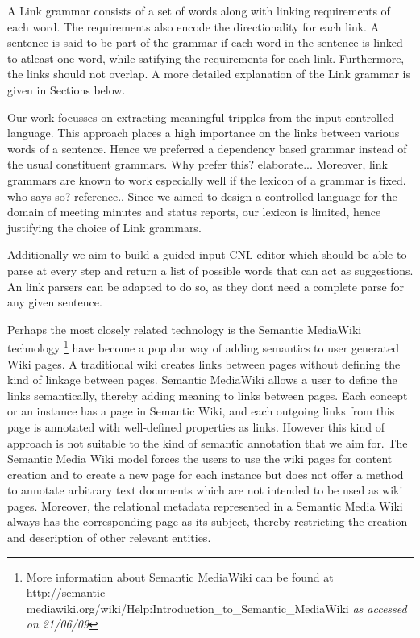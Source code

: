 A Link grammar consists of a set of words along with linking requirements of each word. The requirements also encode the directionality for each link. A sentence is said to be part of the grammar if each word in the sentence is linked to atleast one word, while satifying the requirements for each link. Furthermore, the links should not overlap. A more detailed explanation of the Link grammar is given in Sections below.

Our work focusses on extracting meaningful tripples from the input controlled language. This approach places a high importance on the links between various words of a sentence. Hence we preferred a dependency based grammar instead of the usual constituent grammars. 
Why prefer this? elaborate...
Moreover, link grammars are known to work especially well if the lexicon of a grammar is fixed.
who says so? reference..
 Since we aimed to design a controlled language for the domain of meeting minutes and status reports, our lexicon is limited, hence justifying the choice of Link grammars.
 
 Additionally we aim to build a guided input CNL editor which should be able to parse at every step and return a list of possible words that can act as suggestions. An link parsers can be adapted to do so, as they dont need a complete parse for any given sentence. 
 
 




 
Perhaps the most closely related technology is the Semantic MediaWiki technology \footnote{More information about Semantic MediaWiki can be found 
at http://semantic-mediawiki.org/wiki/Help:Introduction\_to\_Semantic\_MediaWiki \emph{as accessed on 21/06/09}} have become a popular way of adding semantics to user generated Wiki pages.
 A  traditional wiki creates links between pages without defining the kind of linkage between pages. Semantic MediaWiki allows a user to define the links semantically, thereby adding meaning to links between pages. 
Each concept or an instance has a page in Semantic Wiki, and each outgoing links from this page is annotated with well-defined properties as links. However this kind of approach is not suitable to the kind of 
semantic annotation that we aim for. The Semantic Media Wiki model forces the users to use the wiki pages for content creation and to create a new page for each instance but does not offer a method to annotate arbitrary 
text documents which are not intended to be used as wiki pages. 
Moreover, the relational metadata represented in a Semantic Media Wiki always has the corresponding page as its subject, thereby restricting the creation and description of other relevant entities.


